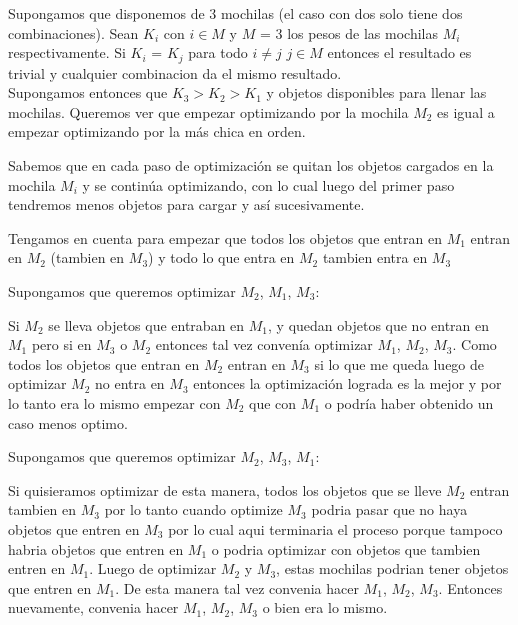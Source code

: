 Supongamos que disponemos de 3 mochilas (el caso con dos solo tiene dos combinaciones). 
Sean $K_i$ con $i \in M$ y $M$ = 3 los pesos de las mochilas $M_i$ respectivamente. Si $K_i$ = $K_j$ para todo $i \neq j$ $j \in M$ entonces el resultado es trivial y cualquier combinacion da el mismo resultado. \\

Supongamos entonces que $K_3 > K_2 > K_1$ y objetos disponibles para llenar las mochilas. Queremos ver que empezar optimizando por la mochila $M_2$ es igual a empezar optimizando por la más chica en orden. 

Sabemos que en cada paso de optimización se quitan los objetos cargados en la mochila $M_i$ y se continúa optimizando, con lo cual luego del primer paso tendremos menos objetos para cargar y así sucesivamente.

Tengamos en cuenta para empezar que todos los objetos que entran en $M_1$ entran en $M_2$ (tambien en $M_3$) y todo lo que entra en $M_2$ tambien entra en $M_3$ 

Supongamos que queremos optimizar $M_2$, $M_1$, $M_3$:

Si $M_2$ se lleva objetos que entraban en $M_1$, y quedan objetos que no entran en $M_1$ pero si en $M_3$ o $M_2$ entonces tal vez convenía optimizar $M_1$, $M_2$, $M_3$. Como todos los objetos que entran en $M_2$ entran en $M_3$ si lo que me queda luego de optimizar $M_2$ no entra en $M_3$ entonces la optimización lograda es la mejor y por lo tanto era lo mismo empezar con $M_2$ que con $M_1$ o podría haber obtenido un caso menos optimo.

Supongamos que queremos optimizar $M_2$, $M_3$, $M_1$: 

Si quisieramos optimizar de esta manera, todos los objetos que se lleve $M_2$ entran tambien en $M_3$ por lo tanto cuando optimize $M_3$ podria pasar que no haya objetos que entren en $M_3$ por lo cual aqui terminaria el proceso porque tampoco habria objetos que entren en $M_1$ o podria optimizar con objetos que tambien entren en $M_1$. Luego de optimizar $M_2$ y $M_3$, estas mochilas podrian tener objetos que entren en $M_1$. De esta manera tal vez convenia hacer $M_1$, $M_2$, $M_3$.
Entonces nuevamente, convenia hacer $M_1$, $M_2$, $M_3$ o bien era lo mismo. 

